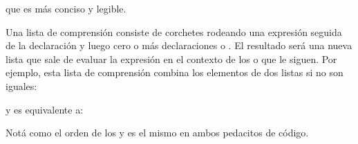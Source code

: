 \documentclass[a4,10pt,spanish]{sphinxmanual}
\begin{document}
\sphinxAtStartPar
que es más conciso y legible.

\sphinxAtStartPar
Una lista de comprensión consiste de corchetes rodeando una expresión seguida de la declaración  y luego cero o más declaraciones  o .  El resultado será una nueva lista que sale de evaluar la expresión en el contexto de los  o  que le siguen.  Por ejemplo, esta lista de comprensión combina los elementos de dos listas si no son iguales:

\begin{sphinxVerbatim}[commandchars=\\\{\}]
\PYG{p}{[}     \PYG{p}{[}\PYG{p}{]}    \PYG{p}{[}\PYG{p}{]}    \PYG{p}{]}
\end{sphinxVerbatim}

\sphinxAtStartPar
y es equivalente a:

\begin{sphinxVerbatim}[commandchars=\\\{\}]
  \PYG{p}{[}\PYG{p}{]}
   \PYG{p}{[}\PYG{p}{]}
       \PYG{p}{[}\PYG{p}{]}
           
             
\end{sphinxVerbatim}

\sphinxAtStartPar
Notá como el orden de los  y  es el mismo en ambos pedacitos de código.
\end{document}
